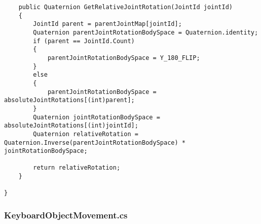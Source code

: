 \begin{verbatim}
    public Quaternion GetRelativeJointRotation(JointId jointId)
    {
        JointId parent = parentJointMap[jointId];
        Quaternion parentJointRotationBodySpace = Quaternion.identity;
        if (parent == JointId.Count)
        {
            parentJointRotationBodySpace = Y_180_FLIP;
        }
        else
        {
            parentJointRotationBodySpace = absoluteJointRotations[(int)parent];
        }
        Quaternion jointRotationBodySpace = absoluteJointRotations[(int)jointId];
        Quaternion relativeRotation =  Quaternion.Inverse(parentJointRotationBodySpace) * jointRotationBodySpace;

        return relativeRotation;
    }

}

\end{verbatim}
\subsubsection*{KeyboardObjectMovement.cs}
